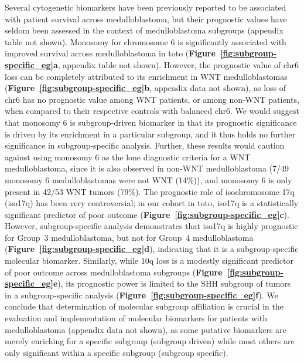 \documentclass[11pt,letterpaper]{article}
\theoremstyle{definition}
\newcommand{\emphlab}[1]{\textbf{\textsf{#1}}}
\newcommand{\citefig}[1]{\emphlab{Figure~\ref{fig:#1}}}
\begin{document}
Several cytogenetic biomarkers have been previously reported to be associated with patient survival across medulloblastoma, but their prognostic values have seldom been assessed in the context of medulloblastoma subgroups (appendix table not shown). Monosomy for chromosome 6 is significantly associated with improved survival across medulloblastoma in toto (\citefig{subgroup-specific_eg}\emphlab{a}, appendix table not shown). However, the prognostic value of chr6 loss can be completely attributed to its enrichment in WNT medulloblastomas (\citefig{subgroup-specific_eg}\emphlab{b}, appendix data not shown), as loss of chr6 has no prognostic value among WNT patients, or among non-WNT patients, when compared to their respective controls with balanced chr6.  We would suggest that monosomy 6 is subgroup-driven biomarker in that its prognostic significance is driven by its enrichment in a particular subgroup, and it thus holds no further significance in subgroup-specific analysis.  Further, these results would caution against using monosomy 6 as the lone diagnostic criteria for a WNT medulloblastoma, since it is also observed in non-WNT medulloblastoma (7/49 monosomy 6 medulloblastomas were not WNT (14\%)), and monosomy 6 is only present in 42/53 WNT tumors (79\%).  The prognostic role of isochromosome 17q (iso17q) has been very controversial; in our cohort in toto, iso17q is a statistically significant predictor of poor outcome (\citefig{subgroup-specific_eg}\emphlab{c}).  However, subgroup-specific analysis demonstrates that iso17q is highly prognostic for Group~3 medulloblastoma, but not for Group~4 medulloblastoma (\citefig{subgroup-specific_eg}\emphlab{d}), indicating that it is a subgroup-specific molecular biomarker.  Similarly, while 10q loss is a modestly significant predictor of poor outcome across medulloblastoma subgroups (\citefig{subgroup-specific_eg}\emphlab{e}), its prognostic power is limited to the SHH subgroup of tumors in a subgroup-specific analysis (\citefig{subgroup-specific_eg}\emphlab{f}).  We conclude that determination of molecular subgroup affiliation is crucial in the evaluation and implementation of molecular biomarkers for patients with medulloblastoma (appendix data not shown), as some putative biomarkers are merely enriching for a specific subgroup (subgroup driven) while most others are only significant within a specific subgroup (subgroup specific).

\clearpage
\end{document}
